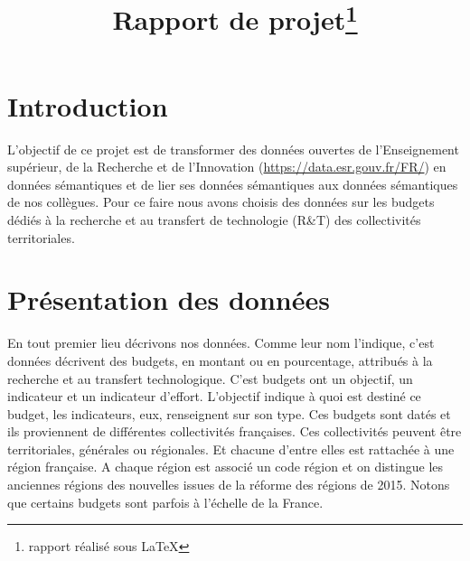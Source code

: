 \documentclass[a4paper,sffamily,12pt]{article}
\title{\vspace{\fill}\LARGE\bfseries\sffamily Rapport de projet\protect\footnote{rapport réalisé sous \LaTeX} \vspace{\fill}}
\begin{document}
	\date{} %
	\maketitle %

	\thispagestyle{fancy} %
	
	\newpage
			
	\renewcommand{\contentsname}{Sommaire}
	\tableofcontents
	
	\newpage
	
	\section{Introduction}

		\vspace{0.5cm}

		L’objectif de ce projet est de transformer des données ouvertes de l'Enseignement supérieur, de la Recherche et de l'Innovation (\url{https://data.esr.gouv.fr/FR/}) en données sémantiques et de lier ses données sémantiques aux données sémantiques de nos collègues. Pour ce faire nous avons choisis des données sur les budgets dédiés à la recherche et au transfert de technologie (R\&T) des collectivités territoriales. \\

		\vspace{0.5cm}
		
	\section{Présentation des données}				

		\vspace{0.5cm}
		
		En tout premier lieu décrivons nos données. Comme leur nom l'indique, c'est données décrivent des budgets, en montant ou en pourcentage, attribués à la recherche et au transfert technologique. C'est budgets ont un objectif, un indicateur et un indicateur d'effort. L'objectif indique à quoi est destiné ce budget, les indicateurs, eux, renseignent sur son type. Ces budgets sont datés et ils proviennent de différentes collectivités françaises. Ces collectivités peuvent être territoriales, générales ou régionales. Et chacune d'entre elles est rattachée à une région française. A chaque région est associé un code région et on distingue les anciennes régions des nouvelles issues de la réforme des régions de 2015. Notons que certains budgets sont parfois à l’échelle de la France. 
				
\end{document}
